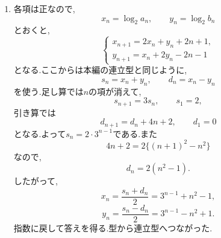 \begin{enumerate}[label=\textbf{問\arabic*.},leftmargin=3.8em,format=\bookitemlink{practice-advanced}{solution}{problem}]
                \noindent \textbf{【別解】}\\
                の式に両辺の係数を掛ける形のまま,
                \[
                 (n+2)(n+4)d_{n+1}
                   =(n+1)(n+3)d_n
                \]
                から$e_n=(n+1)(n+3)d_n$は一定で,$e_1=8$から$d_n=\dfrac{8}{(n+1)(n+3)}$を得る.
                積で残る因子をへ組み込んだ.
          \item 各項は正なので,
                \[
                  x_n=\log_2a_n,\qquad y_n=\log_2b_n
                \]
                とおくと,
                \[
                 \begin{cases}
                  x_{n+1}=2x_n+y_n+2n+1,\\
                  y_{n+1}=x_n+2y_n-2n-1
                 \end{cases}
                \]
                となる.ここからは本編の連立型と同じように,
                \[
                  s_n=x_n+y_n,\qquad d_n=x_n-y_n
                \]
                を使う.足し算では$n$の項が消えて,
                \[
                  s_{n+1}=3s_n,\qquad s_1=2,
                \]
                引き算では
                \[
                  d_{n+1}=d_n+4n+2,\qquad d_1=0
                \]
                となる.よって$s_n=2\cdot3^{n-1}$である.また
                \[
                 4n+2=2\{(n+1)^2-n^2\}
                \]
                なので,
                \[
                 d_n=2(n^2-1).
                \]
                したがって,
                \[
                 x_n=\frac{s_n+d_n}{2}=3^{n-1}+n^2-1,
                \]
                \[
                 y_n=\frac{s_n-d_n}{2}=3^{n-1}-n^2+1.
                \]
                指数に戻して答えを得る.型から連立型へつながった.


\end{enumerate}
